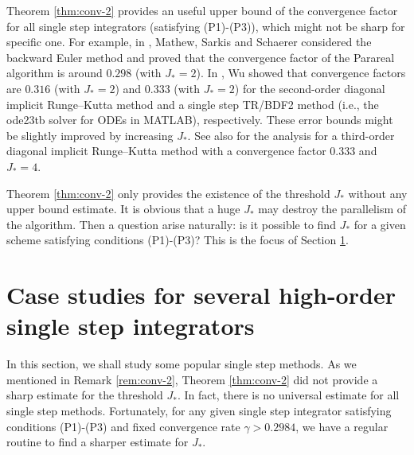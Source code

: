 \begin{remark}\label{rem:conv-1}
Theorem \ref{thm:conv-2} provides an useful upper bound of the convergence factor for all single step integrators
(satisfying (P1)-(P3)),
which might not be sharp for specific one. For example, in \cite[Lemma 4.3]{MathewSarkisSchaerer:2010},
Mathew, Sarkis and Schaerer considered the backward Euler method and proved
that the convergence factor of the Parareal algorithm is around $0.298$ (with $J_*=2$).
In \cite{Wu:2015}, Wu showed that convergence factors are $0.316$ (with $J_*=2$) and $0.333$ (with $J_*=2$)
for the second-order diagonal implicit Runge--Kutta method
and a single step TR/BDF2 method (i.e., the ode23tb solver for ODEs in MATLAB), respectively.
These error bounds might be slightly improved by increasing $J_*$.
See also \cite{WuZhou:2015} for the analysis for a third-order diagonal implicit Runge--Kutta method with a convergence factor $0.333$ and $J_*=4$.
\end{remark}


\begin{remark}\label{rem:conv-2}
Theorem \ref{thm:conv-2} only provides the existence of the threshold $J_*$ without any upper bound estimate.
It is obvious that a huge $J_*$ may destroy the parallelism of the algorithm.
Then a question arise naturally: is it possible to find $J_*$ for a given scheme satisfying conditions (P1)-(P3)? This is the focus of Section \ref{sec:RK}.
\end{remark}


\section{Case studies for several high-order single step integrators}\label{sec:RK}

In this section, we shall study some popular single step methods. As we mentioned in Remark \ref{rem:conv-2},
Theorem \ref{thm:conv-2} did not provide a sharp estimate for the threshold $J_*$.
In fact, there is no universal estimate for all single step methods. Fortunately,
for any given single step integrator satisfying conditions (P1)-(P3) and fixed convergence rate
$\gamma>0.2984$,
we have a regular routine to find a sharper estimate for $J_*$.


